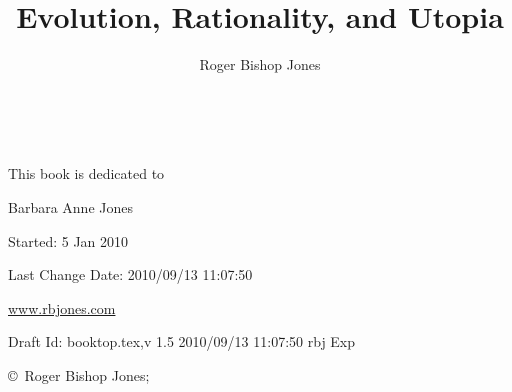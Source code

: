 \documentclass[10pt,titlepage]{book}
\author{Roger Bishop Jones}
\title{Evolution, Rationality, and Utopia}
\date{\ }
\begin{document}
\frontmatter

\begin{titlepage}
\maketitle

\vfill

\begin{centering}

{\parskip=0.3in
This book is dedicated to

{ Barbara Anne Jones}
}

\vfill

{\footnotesize

Started: 5 Jan 2010

Last Change $ $Date: 2010/09/13 11:07:50 $ $

\href{http://www.rbjones.com/}{www.rbjones.com}

Draft $ $Id: booktop.tex,v 1.5 2010/09/13 11:07:50 rbj Exp $ $

\copyright\ Roger Bishop Jones;

}%

\end{centering}

\thispagestyle{empty}
\end{titlepage}

{\parskip=0pt\tableofcontents}
\end{document}
